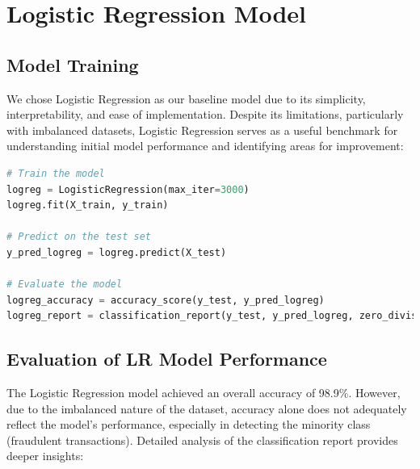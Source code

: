 \documentclass[12pt,a4paper]{report}
\begin{document}
\section{Logistic Regression Model}

\subsection{Model Training}
We chose Logistic Regression as our baseline model due to its simplicity, interpretability, and ease of implementation. Despite its limitations, particularly with imbalanced datasets, Logistic Regression serves as a useful benchmark for understanding initial model performance and identifying areas for improvement:\\

\begin{lstlisting}[language=Python, caption={Model Training and Evaluation}]
# Train the model
logreg = LogisticRegression(max_iter=3000)
logreg.fit(X_train, y_train)

# Predict on the test set
y_pred_logreg = logreg.predict(X_test)

# Evaluate the model
logreg_accuracy = accuracy_score(y_test, y_pred_logreg)
logreg_report = classification_report(y_test, y_pred_logreg, zero_division=0)
\end{lstlisting}

\subsection{Evaluation of LR Model Performance}
The Logistic Regression model achieved an overall accuracy of 98.9\%. However, due to the imbalanced nature of the dataset, accuracy alone does not adequately reflect the model's performance, especially in detecting the minority class (fraudulent transactions). Detailed analysis of the classification report provides deeper insights:
\end{document}

